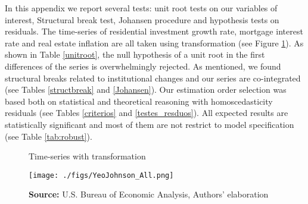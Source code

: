 \documentclass[12pt, a4paper]{article}
\begin{document}
In this appendix we report several tests: unit root tests on our variables of interest, Structural break test, Johansen procedure and hypothesis tests on residuals. 
The time-series of residential investment growth rate, mortgage interest rate and real estate inflation are all taken using \textcite{yeo_new_2000} transformation (see Figure \ref{YeoJhonson}).
As shown in Table \ref{unitroot}, the null hypothesis of a unit root in the first differences of the series is overwhelmingly rejected.
As mentioned, we found structural breaks related to institutional changes and our series are co-integrated (see Tables \ref{structbreak} and \ref{Johansen}).
Our estimation order selection was based both on statistical and theoretical reasoning with homoscedasticity residuals (see Tables \ref{criterios} and \ref{testes_resduos}).
All expected results are statistically significant and most of them are not restrict to model specification (see Table \ref{tab:robust}).

\begin{figure}[htb]
	\centering
	\caption{Time-series with \textcite{yeo_new_2000} transformation}
	\label{YeoJhonson}
	\texttt{[image: ./figs/YeoJohnson\_All.png]}
	\caption*{\textbf{Source:} U.S. Bureau of Economic Analysis, Authors' elaboration}
\end{figure}






\end{document}
